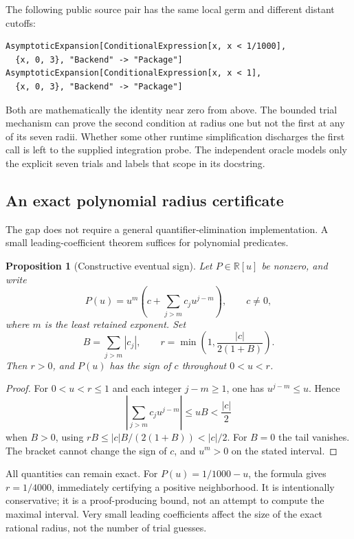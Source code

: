 \documentclass[11pt,a4paper]{article}
\newtheorem{proposition}{Proposition}[section]
\theoremstyle{remark}
\begin{document}
The following public source pair has the same local germ and different distant cutoffs:
\begin{lstlisting}
AsymptoticExpansion[ConditionalExpression[x, x < 1/1000],
  {x, 0, 3}, "Backend" -> "Package"]
AsymptoticExpansion[ConditionalExpression[x, x < 1],
  {x, 0, 3}, "Backend" -> "Package"]
\end{lstlisting}
Both are mathematically the identity near zero from above. The bounded trial mechanism can prove the second condition at radius one but not the first at any of its seven radii. Whether some other runtime simplification discharges the first call is left to the supplied integration probe. The independent oracle models only the explicit seven trials and labels that scope in its docstring.

\subsection{An exact polynomial radius certificate}

The gap does not require a general quantifier-elimination implementation. A small leading-coefficient theorem suffices for polynomial predicates.

\begin{proposition}[Constructive eventual sign]\label{prop:radius}
Let $P\in\mathbb R[u]$ be nonzero, and write
\[
 P(u)=u^m\left(c+\sum_{j>m}c_j u^{j-m}\right),\qquad c\ne0,
\]
where $m$ is the least retained exponent. Set
\begin{equation}\label{eq:radius}
 B=\sum_{j>m}|c_j|,\qquad
 r=\min\left(1,\frac{|c|}{2(1+B)}\right).
\end{equation}
Then $r>0$, and $P(u)$ has the sign of $c$ throughout $0<u<r$.
\end{proposition}
\begin{proof}
For $0<u<r\le1$ and each integer $j-m\ge1$, one has $u^{j-m}\le u$. Hence
\[
 \left|\sum_{j>m}c_j u^{j-m}\right|\le uB<\frac{|c|}{2}
\]
when $B>0$, using $rB\le |c|B/(2(1+B))<|c|/2$. For $B=0$ the tail vanishes. The bracket cannot change the sign of $c$, and $u^m>0$ on the stated interval.
\end{proof}

All quantities can remain exact. For $P(u)=1/1000-u$, the formula gives $r=1/4000$, immediately certifying a positive neighborhood. It is intentionally conservative; it is a proof-producing bound, not an attempt to compute the maximal interval. Very small leading coefficients affect the size of the exact rational radius, not the number of trial guesses.
\end{document}
